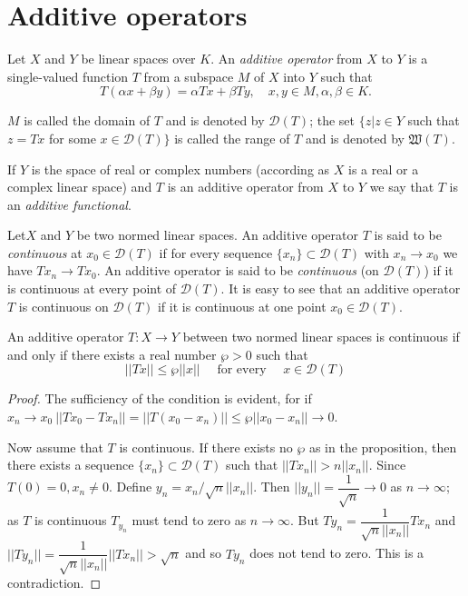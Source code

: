 \section{Additive operators}\label{chap1:sec10}

\begin{defi*}%
 Let $X$ and $Y$ be linear spaces over $K$. An {\em additive
  operator} from $X$ to $Y$ is a single-valued function $T$ from a
 subspace $M$ of $X$ into $Y$ such that 
 $$
 T(\alpha x + \beta y) = \alpha Tx + \beta Ty, \quad x, y \in M,
 \alpha, \beta \in K. 
 $$
 
 $M$ is called the domain of $T$ and is denoted by $\mathscr{D} (T)$;
 the set $\{ z | z \in Y $ such that $ z =Tx$ for some $ x \in
 \mathscr{D} (T) \}$ is called the range of $T$ and is denoted by
 $\mathfrak{W} (T)$. 
\end{defi*}

If $Y$ is the space of real or complex numbers (according as $X$ is a
real or a complex linear space) and $T$ is an additive operator from
$X$ to $Y$ we say that $T$ is an \textit{additive functional}. 

\begin{defi*}%
 Let\pageoriginale $X$ and $Y$ be two normed linear spaces. An additive operator
 $T$ is said to be {\em continuous} at $x_0 \in \mathscr{D} (T)$ if
 for every sequence $\{ x_n\} \subset \mathscr{D} (T)$ with $x_n \to
 x_0$ we have $Tx_n \to Tx_0$. An additive operator is said to be
 {\em continuous} (on $\mathscr{D}(T)$) if it is continuous at every
 point of $\mathscr{D}(T)$. It is easy to see that an additive
 operator $T$ is continuous on $\mathscr{D} (T)$ if it is continuous
 at one point $x_0 \in \mathscr{D} (T)$. 
\end{defi*}

\begin{prop*}%
 An additive operator $T: X \to Y$ between two normed linear spaces
 is continuous if and only if there exists a real number $\wp > 0$
 such that 
 $$
 || Tx || \le \wp || x|| \quad \text{ for every } \quad x \in
 \mathscr{D} (T) 
 $$
\end{prop*}

\begin{proof}
 The sufficiency of the condition is evident, for if $x_n \to x_0 ~ ||
 Tx_0 - Tx_n || = || T(x_0 - x_n) || \le \wp || x_0 - x_n || \to 0$. 

 Now assume that $T$ is continuous. If there exists no $\wp$ as in
 the proposition, then there exists a sequence $\{x_n\} \subset
 \mathscr{D}(T)$ such that $|| Tx_n || > n || x_n ||$. Since $T(0) =
 0, x_n \ne 0$. Define $y_n = x_n/ \sqrt{n} || x_n ||$. Then $|| y_n
 || = \dfrac{1}{\sqrt{n}} \to 0$ as $n \to \infty$; as $T$ is
 continuous $T_{y_n}$ must tend to zero as $n \to \infty$. But $Ty_n
 = \dfrac{1}{\sqrt{n}||x_n||} Tx_n$ and $|| Ty_n || =
 \dfrac{1}{\sqrt{n}||x_n||} ||Tx_n || > \sqrt{n}$ and so $Ty_n$ does
 not tend to zero. This is a contradiction. 
\end{proof}

